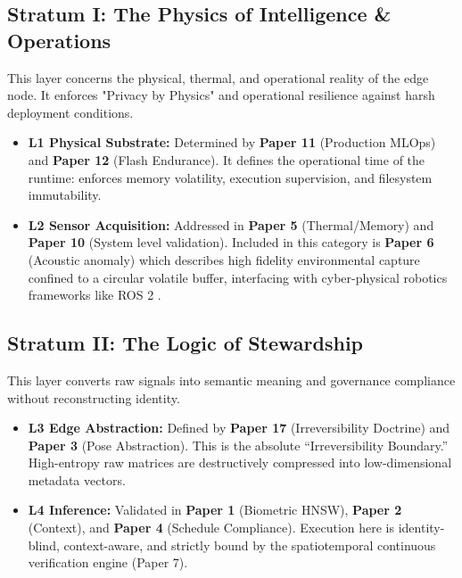 \documentclass[conference]{IEEEtran}
\begin{document}
\subsection{Stratum I: The Physics of Intelligence \& Operations}
This layer concerns the physical, thermal, and operational reality of the edge node. It enforces "Privacy by Physics" and operational resilience against harsh deployment conditions.
\begin{itemize}
    \item \textbf{L1 Physical Substrate:} Determined by \textbf{Paper 11} (Production MLOps) and \textbf{Paper 12} (Flash Endurance). It defines the operational time of the runtime: enforces memory volatility, execution supervision, and filesystem immutability. 
    \item \textbf{L2 Sensor Acquisition:} Addressed in \textbf{Paper 5} (Thermal/Memory) and \textbf{Paper 10} (System level validation). Included in this category is \textbf{Paper 6} (Acoustic anomaly) which describes high fidelity environmental capture confined to a circular volatile buffer, interfacing with cyber-physical robotics frameworks like ROS 2 \cite{b_ros2}.
\end{itemize}

\subsection{Stratum II: The Logic of Stewardship}
This layer converts raw signals into semantic meaning and governance compliance without reconstructing identity. 
\begin{itemize}
    \item \textbf{L3 Edge Abstraction:} Defined by \textbf{Paper 17} (Irreversibility Doctrine) and \textbf{Paper 3} (Pose Abstraction). This is the absolute ``Irreversibility Boundary.'' High-entropy raw matrices are destructively compressed into low-dimensional metadata vectors.
    \item \textbf{L4 Inference:} Validated in \textbf{Paper 1} (Biometric HNSW), \textbf{Paper 2} (Context), and \textbf{Paper 4} (Schedule Compliance). Execution here is identity-blind, context-aware, and strictly bound by the spatiotemporal continuous verification engine (Paper 7).
\end{itemize}
\end{document}
